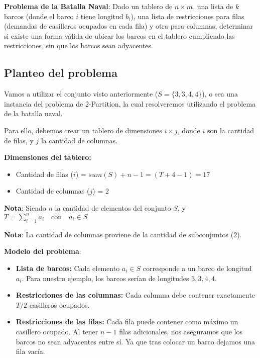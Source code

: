 \vskip0.5cm
\textbf{Problema de la Batalla Naval}: Dado un tablero de $n \times m$, una lista de $k$ barcos (donde el barco $i$ tiene longitud $b_i$), una lista de restricciones para filas (demandas de casilleros ocupados en cada fila) y otra para columnas, determinar si existe una forma válida de ubicar los barcos en el tablero cumpliendo las restricciones, sin que los barcos sean adyacentes.

\subsection*{Planteo del problema}

Vamos a utilizar el conjunto visto anteriormente ($S = \{3,3,4,4\}$), o sea una instancia del problema de 2-Partition, la cual resolveremos utilizando el problema de la batalla naval.

Para ello, debemos crear un tablero de dimensiones $i \times j$, donde $i$ son la cantidad de filas, y $j$ la cantidad de columnas.

\textbf{Dimensiones del tablero:}
\begin{itemize}
    \item Cantidad de filas ($i$) = $sum(S) + n - 1  = (T + 4 - 1 ) = 17$
    \item Cantidad de columnas ($j$) = $2$ 
\end{itemize}
\vskip0.5cm

\textbf{Nota}: Siendo $n$ la cantidad de elementos del conjunto $S$, y $T = \sum_{i=1}^{n} a_i \quad \text{con} \quad a_i \in S$

\vskip0.25cm

\textbf{Nota}: La cantidad de columnas proviene de la cantidad de subconjuntos (2).

\vskip0.5cm

\textbf{Modelo del problema}:

\begin{itemize}
    \item \textbf{Lista de barcos:} Cada elemento $a_i \in S$ corresponde a un barco de longitud $a_i$. Para nuestro ejemplo, los barcos serían de longitudes $3, 3, 4, 4$.

    \item \textbf{Restricciones de las columnas:}
    Cada columna debe contener exactamente $T / 2$ casilleros ocupados. 

    \item \textbf{Restricciones de las filas:}
    Cada fila puede contener como máximo un casillero ocupado. Al tener $n - 1$ filas adicionales, nos aseguramos que los barcos no sean adyacentes entre sí. Ya que tras colocar un barco dejamos una fila vacía.
\end{itemize}

